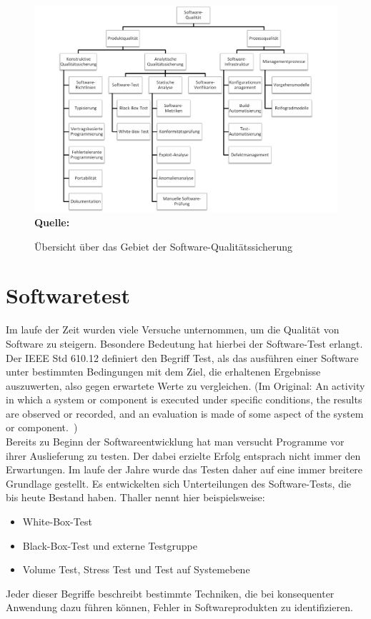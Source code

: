 \begin{figure}[htb]
  \centering  
  \includegraphics[scale=0.7]{img/softwarequalitaet.png}\\
  \footnotesize\sffamily\textbf{Quelle:} \cite[vgl. S.20]{hoffmann_software-qualitat_2013}
  \caption{Übersicht über das Gebiet der Software-Qualitätssicherung}
  \label{fig:softwareQualitätssicherung}
\end{figure}



\section{Softwaretest}
\label{sec:softwaretest}
Im laufe der Zeit wurden viele Versuche unternommen, um die Qualität von Software zu steigern. Besondere Bedeutung hat hierbei der Software-Test erlangt.
Der IEEE Std 610.12 definiert den Begriff Test, als das ausführen einer Software unter bestimmten Bedingungen mit dem Ziel, die erhaltenen Ergebnisse auszuwerten, also gegen erwartete Werte zu vergleichen.
(Im Original: \glqq An activity in which a system or component is executed under specific conditions, the results are observed or recorded, and an evaluation is made of some aspect of the system or component.\grqq\ \cite{ieee_ieee_1991})\\
Bereits zu Beginn der Softwareentwicklung hat man versucht Programme vor ihrer Auslieferung zu testen. Der dabei erzielte Erfolg entsprach nicht immer den Erwartungen. Im laufe der Jahre wurde das Testen daher auf eine immer breitere Grundlage gestellt. Es entwickelten sich Unterteilungen des Software-Tests, die bis heute Bestand haben. Thaller \cite[vgl. S.18]{thaller_software-test_2002} nennt hier beispielsweise:
\begin{itemize}
\item White-Box-Test
\item Black-Box-Test und externe Testgruppe
\item Volume Test, Stress Test und Test auf Systemebene
\end{itemize}
Jeder dieser Begriffe beschreibt bestimmte Techniken, die bei konsequenter Anwendung dazu führen können, Fehler in Softwareprodukten zu identifizieren. 

